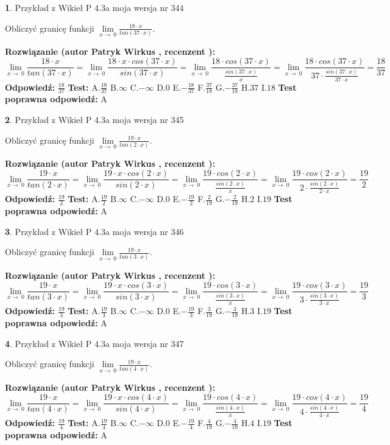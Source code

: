 \documentclass[12pt, a4paper]{article}
\theoremstyle{definition} %
\newtheorem{zad}{}
\newcommand{\zadStart}[1]{\begin{zad}#1\newline}
\newcommand{\zadStop}{\end{zad}}
\newcommand{\rozwStart}[2]{\noindent \textbf{Rozwiązanie (autor #1 , recenzent #2): }\newline}
\newcommand{\rozwStop}{\newline}
\newcommand{\odpStart}{\noindent \textbf{Odpowiedź:}\newline}
\newcommand{\odpStop}{\newline}
\newcommand{\testStart}{\noindent \textbf{Test:}\newline}
\newcommand{\testStop}{\newline}
\newcommand{\kluczStart}{\noindent \textbf{Test poprawna odpowiedź:}\newline}
\newcommand{\kluczStop}{\newline}
\begin{document}
\zadStart{Przykład z Wikieł P 4.3a moja wersja nr 344}


Obliczyć granicę funkcji $\lim\limits_{x\to\ 0}\frac{18 \cdot x}{tan(37 \cdot x)}$.
\zadStop
\rozwStart{Patryk Wirkus}{}
$$\lim\limits_{x\to\ 0}\frac{18 \cdot x}{tan(37 \cdot x)}=\lim\limits_{x\to\ 0}\frac{18 \cdot x \cdot cos(37 \cdot x)}{sin(37 \cdot x)}=\lim\limits_{x\to\ 0}\frac{18 \cdot cos(37 \cdot x)}{\frac{sin(37 \cdot x)}{x}}=\lim\limits_{x\to\ 0}\frac{18 \cdot cos(37 \cdot x)}{37 \cdot \frac{sin(37 \cdot x)}{37 \cdot x}} = \frac{18}{37}$$
\rozwStop
\odpStart
$\frac{18}{37}$
\odpStop
\testStart
A.$\frac{18}{37}$
B.$\infty$
C.$-\infty$
D.$0$
E.$-\frac{18}{37}$
F.$\frac{37}{18}$
G.$-\frac{37}{18}$
H.$37$
I.$18$
\testStop
\kluczStart
A
\kluczStop



\zadStart{Przykład z Wikieł P 4.3a moja wersja nr 345}


Obliczyć granicę funkcji $\lim\limits_{x\to\ 0}\frac{19 \cdot x}{tan(2 \cdot x)}$.
\zadStop
\rozwStart{Patryk Wirkus}{}
$$\lim\limits_{x\to\ 0}\frac{19 \cdot x}{tan(2 \cdot x)}=\lim\limits_{x\to\ 0}\frac{19 \cdot x \cdot cos(2 \cdot x)}{sin(2 \cdot x)}=\lim\limits_{x\to\ 0}\frac{19 \cdot cos(2 \cdot x)}{\frac{sin(2 \cdot x)}{x}}=\lim\limits_{x\to\ 0}\frac{19 \cdot cos(2 \cdot x)}{2 \cdot \frac{sin(2 \cdot x)}{2 \cdot x}} = \frac{19}{2}$$
\rozwStop
\odpStart
$\frac{19}{2}$
\odpStop
\testStart
A.$\frac{19}{2}$
B.$\infty$
C.$-\infty$
D.$0$
E.$-\frac{19}{2}$
F.$\frac{2}{19}$
G.$-\frac{2}{19}$
H.$2$
I.$19$
\testStop
\kluczStart
A
\kluczStop



\zadStart{Przykład z Wikieł P 4.3a moja wersja nr 346}


Obliczyć granicę funkcji $\lim\limits_{x\to\ 0}\frac{19 \cdot x}{tan(3 \cdot x)}$.
\zadStop
\rozwStart{Patryk Wirkus}{}
$$\lim\limits_{x\to\ 0}\frac{19 \cdot x}{tan(3 \cdot x)}=\lim\limits_{x\to\ 0}\frac{19 \cdot x \cdot cos(3 \cdot x)}{sin(3 \cdot x)}=\lim\limits_{x\to\ 0}\frac{19 \cdot cos(3 \cdot x)}{\frac{sin(3 \cdot x)}{x}}=\lim\limits_{x\to\ 0}\frac{19 \cdot cos(3 \cdot x)}{3 \cdot \frac{sin(3 \cdot x)}{3 \cdot x}} = \frac{19}{3}$$
\rozwStop
\odpStart
$\frac{19}{3}$
\odpStop
\testStart
A.$\frac{19}{3}$
B.$\infty$
C.$-\infty$
D.$0$
E.$-\frac{19}{3}$
F.$\frac{3}{19}$
G.$-\frac{3}{19}$
H.$3$
I.$19$
\testStop
\kluczStart
A
\kluczStop



\zadStart{Przykład z Wikieł P 4.3a moja wersja nr 347}


Obliczyć granicę funkcji $\lim\limits_{x\to\ 0}\frac{19 \cdot x}{tan(4 \cdot x)}$.
\zadStop
\rozwStart{Patryk Wirkus}{}
$$\lim\limits_{x\to\ 0}\frac{19 \cdot x}{tan(4 \cdot x)}=\lim\limits_{x\to\ 0}\frac{19 \cdot x \cdot cos(4 \cdot x)}{sin(4 \cdot x)}=\lim\limits_{x\to\ 0}\frac{19 \cdot cos(4 \cdot x)}{\frac{sin(4 \cdot x)}{x}}=\lim\limits_{x\to\ 0}\frac{19 \cdot cos(4 \cdot x)}{4 \cdot \frac{sin(4 \cdot x)}{4 \cdot x}} = \frac{19}{4}$$
\rozwStop
\odpStart
$\frac{19}{4}$
\odpStop
\testStart
A.$\frac{19}{4}$
B.$\infty$
C.$-\infty$
D.$0$
E.$-\frac{19}{4}$
F.$\frac{4}{19}$
G.$-\frac{4}{19}$
H.$4$
I.$19$
\testStop
\kluczStart
A
\kluczStop
\end{document}
